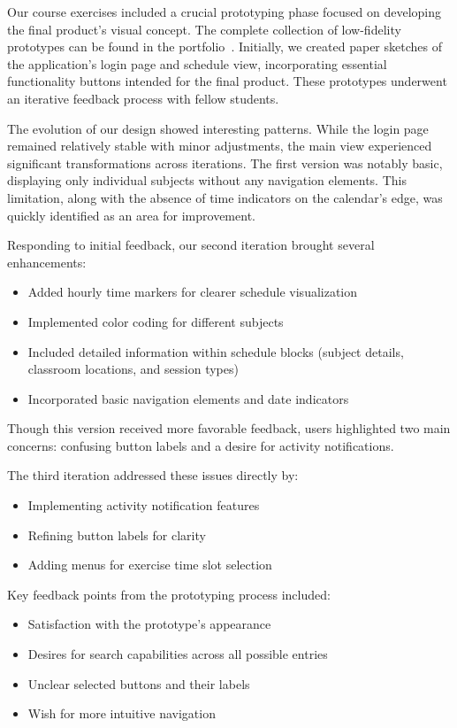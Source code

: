 \documentclass[sigconf,nonacm]{acmart}
\begin{document}
Our course exercises included a crucial prototyping phase focused on developing the final product's visual concept. The complete collection of low-fidelity prototypes can be found in the portfolio~\cite{prototyping}. Initially, we created paper sketches of the application's login page and schedule view, incorporating essential functionality buttons intended for the final product. These prototypes underwent an iterative feedback process with fellow students.

\noindent
The evolution of our design showed interesting patterns. While the login page remained relatively stable with minor adjustments, the main view experienced significant transformations across iterations. The first version was notably basic, displaying only individual subjects without any navigation elements. This limitation, along with the absence of time indicators on the calendar's edge, was quickly identified as an area for improvement.

\noindent
Responding to initial feedback, our second iteration brought several enhancements:
\begin{itemize}
    \item Added hourly time markers for clearer schedule visualization
    \item Implemented color coding for different subjects
    \item Included detailed information within schedule blocks (subject details, classroom locations, and session types)
    \item Incorporated basic navigation elements and date indicators
\end{itemize}

\noindent
Though this version received more favorable feedback, users highlighted two main concerns: confusing button labels and a desire for activity notifications.

\noindent
The third iteration addressed these issues directly by:
\begin{itemize}
    \item Implementing activity notification features
    \item Refining button labels for clarity
    \item Adding menus for exercise time slot selection
\end{itemize}

\noindent
Key feedback points from the prototyping process included:
\begin{itemize}
    \item Satisfaction with the prototype's appearance
    \item Desires for search capabilities across all possible entries
    \item Unclear selected buttons and their labels
    \item Wish for more intuitive navigation
\end{itemize}
\end{document}
